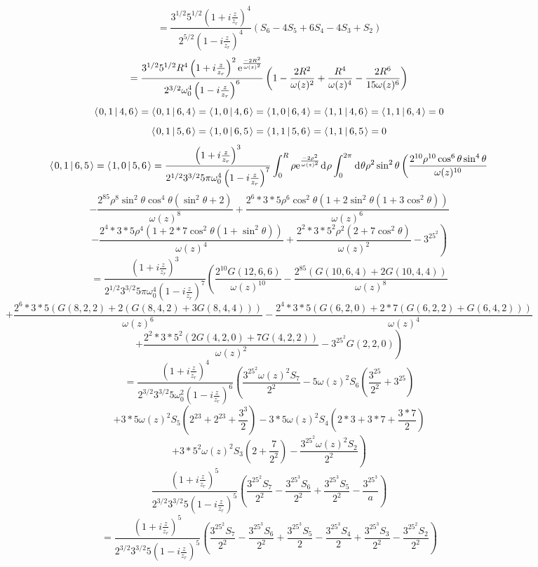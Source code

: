 \documentclass[11pt]{amsart}
\makeatletter
\newcommand{\e}{{\rm e}}				%
\newcommand{\msp}[1]{\mspace{#1mu}}		%
\newcommand{\0}{\varnothing}		%
\newcommand{\dd}{\msp{1} {\rm{d}} \msp{1}}	%
\newcommand{\brac}[2]{\left\langle\msp{2} #1\left\lvert \msp{3.5} #2 \right.\right\rangle}	%
\newcommand{\1}{!}
\newcommand{\2}{@}
\newcommand{\3}{\#}
\newcommand{\4}{\$}
\newcommand{\5}{\%}
\newcommand{\6}{$^\wedge$}
\newcommand{\7}{\&}
\newcommand{\8}{*}
\newcommand{\9}{(}
\makeatother
\begin{document}
\[
=\frac{3^{1/2}5^{1/2}\left(1+i\frac{z}{z_r}\right)^4}{2^{5/2}\left(1-i\frac{z}{z_r}\right)^4}\left(S_6-4S_5+6S_4-4S_3+S_2\right)
\]
\[
=\frac{3^{1/2}5^{1/2}R^4\left(1+i\frac{z}{z_r}\right)^2\e^{\frac{-2R^2}{\omega(z)^2}}}{2^{3/2}\omega_0^4\left(1-i\frac{z}{z_r}\right)^6}\left(1-\frac{2R^2}{\omega(z)^2}+\frac{R^4}{\omega(z)^4}-\frac{2R^6}{15\omega(z)^6}\right)
\]
\[
\brac{0,1}{4,6} = \brac{0,1}{6,4} = \brac{1,0}{4,6}=\brac{1,0}{6,4}=\brac{1,1}{4,6} = \brac{1,1}{6,4} = 0
\]
\[
\brac{0,1}{5,6} = \brac{1,0}{6,5} =\brac{1,1}{5,6} = \brac{1,1}{6,5} = 0
\]
\[
\brac{0,1}{6,5} = \brac{1,0}{5,6} = \frac{\left(1+i\frac{z}{z_r}\right)^3}{2^{1/2}3^{3/2}5\pi\omega_0^4\left(1-i\frac{z}{z_r}\right)^7}\int_0^R \rho \e^{\frac{-2\rho^2}{\omega(z)^2}}\dd \rho \int_0^{2\pi}\dd \theta\rho^2\sin^2\theta\left(\frac{2^{10}\rho^{10}\cos^6\theta\sin^4\theta}{\omega(z)^{10}}\right.
\]
\[
\left.-\frac{2^85\rho^8\sin^2\theta\cos^4\theta\left(\sin^2\theta+2\right)}{\omega(z)^8}+\frac{2^6*3*5\rho^6\cos^2\theta\left(1+2\sin^2\theta\left(1+3\cos^2\theta\right)\right)}{\omega(z)^6}\right.
\]
\[
\left.-\frac{2^4*3*5\rho^4\left(1+2*7\cos^2\theta\left(1+\sin^2\theta\right)\right)}{\omega(z)^4}+\frac{2^2*3*5^2\rho^2\left(2+7\cos^2\theta\right)}{\omega(z)^2}-3^25^2\right)
\]
\[
=\frac{\left(1+i\frac{z}{z_r}\right)^3}{2^{1/2}3^{3/2}5\pi \omega_0^4\left(1-i\frac{z}{z_r}\right)^7}\left(\frac{2^{10}G(12,6,6)}{\omega(z)^{10}}-\frac{2^85\left(G(10,6,4)+2G(10,4,4)\right)}{\omega(z)^8}\right.
\]
\[
\left.+\frac{2^6*3*5\left(G(8,2,2)+2\left(G(8,4,2)+3G(8,4,4)\right)\right)}{\omega(z)^6}-\frac{2^4*3*5\left(G(6,2,0)+2*7\left(G(6,2,2)+G(6,4,2)\right)\right)}{\omega(z)^4}\right.
\]
\[
\left.+\frac{2^2*3*5^2\left(2G(4,2,0)+7G(4,2,2)\right)}{\omega(z)^2}-3^25^2G(2,2,0)\right)
\]
\[
=\frac{\left(1+i\frac{z}{z_r}\right)^4}{2^{3/2}3^{3/2}5\omega_0^2\left(1-i\frac{z}{z_r}\right)^6}\left(\frac{3^25^2\omega(z)^2S_7}{2^2}-5\omega(z)^2S_6\left(\frac{3^25}{2^2}+3^25\right)\right.
\]
\[
\left.+3*5\omega(z)^2S_5\left(2^23+2^23+\frac{3^3}{2}\right)-3*5\omega(z)^2S_4\left(2*3+3*7+\frac{3*7}{2}\right)\right.
\]
\[
\left. +3*5^2\omega(z)^2S_3\left(2+\frac{7}{2^2}\right)-\frac{3^25^2\omega(z)^2S_2}{2^2} \right)
\]
\[
\frac{\left(1+i\frac{z}{z_r}\right)^5}{2^{3/2}3^{3/2}5\left(1-i\frac{z}{z_r}\right)^5}\left(\frac{3^25^2S_7}{2^2}-\frac{3^25^3S_6}{2^2}+\frac{3^25^3S_5}{2^2}-\frac{3^25^3}{a}\right)
\]
\[
=\frac{\left(1+i\frac{z}{z_r}\right)^5}{2^{3/2}3^{3/2}5\left(1-i\frac{z}{z_r}\right)^5}\left(\frac{3^25^2S_7}{2^2}-\frac{3^25^3S_6}{2^2}+\frac{3^25^3S_5}{2}-\frac{3^25^3S_4}{2}+\frac{3^25^3S_3}{2^2}-\frac{3^25^2S_2}{2^2}\right)
\]
\end{document}
